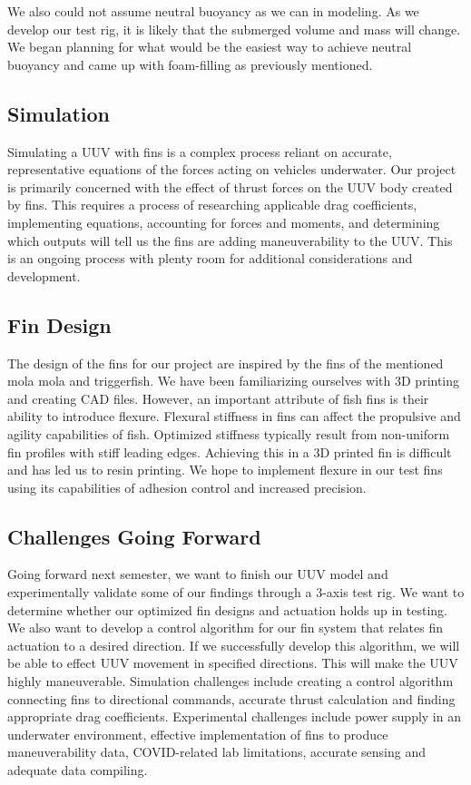 \documentclass[10pt]{article}
\begin{document}
We also could not assume neutral buoyancy as we can in modeling. As we develop our test rig, it is likely that the submerged volume and mass will change. We began planning for what would be the easiest way to achieve neutral buoyancy and came up with foam-filling as previously mentioned. 

\subsection{Simulation}
Simulating a UUV with fins is a complex process reliant on accurate, representative equations of the forces acting on vehicles underwater. Our project is primarily concerned with the effect of thrust forces on the UUV body created by fins. This requires a process of researching applicable drag coefficients, implementing equations, accounting for forces and moments, and determining which outputs will tell us the fins are adding maneuverability to the UUV. This is an ongoing process with plenty room for additional considerations and development.

\subsection{Fin Design}
The design of the fins for our project are inspired by the fins of the mentioned mola mola and triggerfish. We have been familiarizing ourselves with 3D printing and creating CAD files. However, an important attribute of fish fins is their ability to introduce flexure. Flexural stiffness in fins can affect the propulsive and agility capabilities of fish. Optimized stiffness typically result from non-uniform fin profiles with stiff leading edges. Achieving this in a 3D printed fin is difficult and has led us to resin printing. We hope to implement flexure in our test fins using its capabilities of adhesion control and increased precision. 




\subsection{Challenges Going Forward}
Going forward next semester, we want to finish our UUV model and experimentally validate some of our findings through a 3-axis test rig. We want to determine whether our optimized fin designs and actuation holds up in testing. We also want to develop a control algorithm for our fin system that relates fin actuation to a desired direction. If we successfully develop this algorithm, we will be able to effect UUV movement in specified directions. This will make the UUV highly maneuverable. Simulation challenges include creating a control algorithm connecting fins to directional commands, accurate thrust calculation and finding appropriate drag coefficients. Experimental challenges include power supply in an underwater environment, effective implementation of fins to produce maneuverability data, COVID-related lab limitations, accurate sensing and adequate data compiling. 

\end{document}
